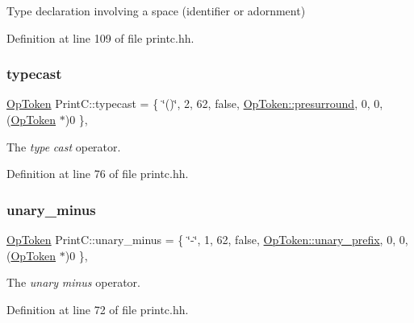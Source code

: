 Type declaration involving a space (identifier or adornment) 



Definition at line 109 of file printc.\+hh.

\mbox{\label{class_print_c_a62507aae00282b4100905ce34bedaab8}} 
\subsubsection{\texorpdfstring{typecast}{typecast}}
{\footnotesize\ttfamily \mbox{\hyperlink{class_op_token}{Op\+Token}} Print\+C\+::typecast = \{ \char`\"{}()\char`\"{}, 2, 62, false, \mbox{\hyperlink{class_op_token_af41c7f108d5662ede7765c5a6c44eaffa883dcb2236a61ce30b67ac1da8b817b8}{Op\+Token\+::presurround}}, 0, 0, (\mbox{\hyperlink{class_op_token}{Op\+Token}} $\ast$)0 \}\hspace{0.3cm}{\ttfamily [static]}, {\ttfamily [protected]}}



The {\itshape type} {\itshape cast} operator. 



Definition at line 76 of file printc.\+hh.

\mbox{\label{class_print_c_ac432b442df9751d73278efcb58c666b8}} 
\subsubsection{\texorpdfstring{unary\_minus}{unary\_minus}}
{\footnotesize\ttfamily \mbox{\hyperlink{class_op_token}{Op\+Token}} Print\+C\+::unary\+\_\+minus = \{ \char`\"{}-\/\char`\"{}, 1, 62, false, \mbox{\hyperlink{class_op_token_af41c7f108d5662ede7765c5a6c44eaffa0d809c13f66611247b81856fc9e68289}{Op\+Token\+::unary\+\_\+prefix}}, 0, 0, (\mbox{\hyperlink{class_op_token}{Op\+Token}} $\ast$)0 \}\hspace{0.3cm}{\ttfamily [static]}, {\ttfamily [protected]}}



The {\itshape unary} {\itshape minus} operator. 



Definition at line 72 of file printc.\+hh.

\mbox{\label{class_print_c_aa8b66477d2689e307a2fc49fd74d31c0}} 
